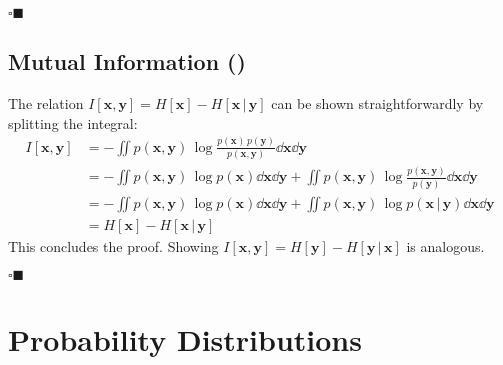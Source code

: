 \documentclass[11pt, a4paper]{scrartcl}
\renewcommand{\vec}[1]{\bm{#1}}
\newcommand{\given}{\,\vert\,}
\newcommand{\qedeot}{\hfill\(\square\blacksquare\)}
\newcommand{\diffstar}{\texorpdfstring{\raisebox{-1pt}{\resizebox{!}{8pt}{\(\star\)}}}{*}}
\newcommand{\onestar}  {(\diffstar)}
\begin{document}
			\qedeot

		\subsection{Mutual Information  \onestar}
			The relation \( I[\vec{x}, \vec{y}] = H[\vec{x}] - H[\vec{x} \given \vec{y}] \) can be shown straightforwardly by splitting the integral:
			\begin{align}
				I[\vec{x}, \vec{y}]
					&= -\!\iint\! p(\vec{x}, \vec{y}) \, \log \frac{p(\vec{x}) \, p(\vec{y})}{p(\vec{x}, \vec{y})} \dd{\vec{x}} \dd{\vec{y}} \\
					&= -\!\iint\! p(\vec{x}, \vec{y}) \, \log p(\vec{x}) \dd{\vec{x}} \dd{\vec{y}} + \iint\! p(\vec{x}, \vec{y}) \, \log \frac{p(\vec{x}, \vec{y})}{p(\vec{y})} \dd{\vec{x}} \dd{\vec{y}} \\
					&= -\!\iint\! p(\vec{x}, \vec{y}) \, \log p(\vec{x}) \dd{\vec{x}} \dd{\vec{y}} + \iint\! p(\vec{x}, \vec{y}) \, \log p(\vec{x} \given \vec{y}) \dd{\vec{x}} \dd{\vec{y}} \\
					&= H[\vec{x}] - H[\vec{x} \given \vec{y}]
			\end{align}
			This concludes the proof. Showing \( I[\vec{x}, \vec{y}] = H[\vec{y}] - H[\vec{y} \given \vec{x}] \) is analogous.

			\qedeot

	\section{Probability Distributions}
\end{document}
